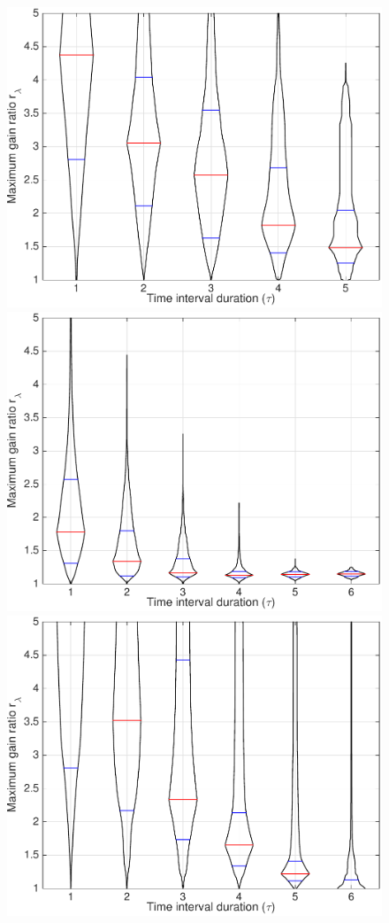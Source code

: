 \begin{figure}
\includegraphics[width=\mylength]{dist/20131115-maxGain-local-relativePerf}
\includegraphics[width=\mylength]{dist/20131119-maxGain-local-relativePerf}
\includegraphics[width=\mylength]{dist/20141003-maxGain-local-relativePerf} \\

\end{figure}
